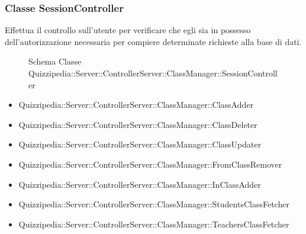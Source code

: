 \subsubsection{Classe SessionController}
Effettua il controllo sull'utente per verificare che egli sia in possesso dell'autorizzazione necessaria per compiere determinate richieste alla base di dati.
\begin{figure}[H]
\centering
\noindent{}
\caption[Schema Classe SessionController]{Schema Classe Quizzipedia::Server::ControllerServer::ClassManager::SessionController}
\end{figure}
\begin{itemize}
\item Quizzipedia::Server::ControllerServer::ClassManager::ClassAdder
\item Quizzipedia::Server::ControllerServer::ClassManager::ClassDeleter
\item Quizzipedia::Server::ControllerServer::ClassManager::ClassUpdater
\item Quizzipedia::Server::ControllerServer::ClassManager::FromClassRemover
\item Quizzipedia::Server::ControllerServer::ClassManager::InClassAdder
\item Quizzipedia::Server::ControllerServer::ClassManager::StudentsClassFetcher
\item Quizzipedia::Server::ControllerServer::ClassManager::TeachersClassFetcher
\end{itemize}

